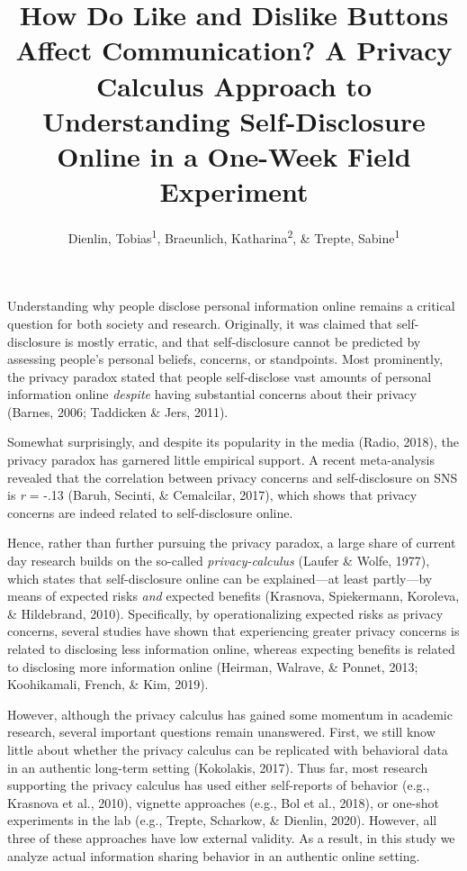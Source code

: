 \documentclass[
  english,
  man,floatsintext]{apa6}
\author{Dienlin, Tobias\textsuperscript{1}, Braeunlich, Katharina\textsuperscript{2}, \& Trepte, Sabine\textsuperscript{1}}
\affiliation{
\vspace{0.5cm}
\textsuperscript{1} University of Hohenheim\\\textsuperscript{2} University of Koblenz-Landau}
\title{How Do Like and Dislike Buttons Affect Communication? A Privacy Calculus Approach to Understanding Self-Disclosure Online in a One-Week Field Experiment}
\date{}
\begin{document}
\maketitle

Understanding why people disclose personal information online remains a critical question for both society and research.
Originally, it was claimed that self-disclosure is mostly erratic, and that self-disclosure cannot be predicted by assessing people's personal beliefs, concerns, or standpoints.
Most prominently, the privacy paradox stated that people self-disclose vast amounts of personal information online \emph{despite} having substantial concerns about their privacy (Barnes, 2006; Taddicken \& Jers, 2011).

Somewhat surprisingly, and despite its popularity in the media (Radio, 2018), the privacy paradox has garnered little empirical support.
A recent meta-analysis revealed that the correlation between privacy concerns and self-disclosure on SNS is \emph{r} = -.13 (Baruh, Secinti, \& Cemalcilar, 2017), which shows that privacy concerns are indeed related to self-disclosure online.

Hence, rather than further pursuing the privacy paradox, a large share of current day research builds on the so-called \emph{privacy-calculus} (Laufer \& Wolfe, 1977), which states that self-disclosure online can be explained---at least partly---by means of expected risks \emph{and} expected benefits (Krasnova, Spiekermann, Koroleva, \& Hildebrand, 2010).
Specifically, by operationalizing expected risks as privacy concerns, several studies have shown that experiencing greater privacy concerns is related to disclosing less information online, whereas expecting benefits is related to disclosing more information online (Heirman, Walrave, \& Ponnet, 2013; Koohikamali, French, \& Kim, 2019).

However, although the privacy calculus has gained some momentum in academic research, several important questions remain unanswered.
First, we still know little about whether the privacy calculus can be replicated with behavioral data in an authentic long-term setting (Kokolakis, 2017).
Thus far, most research supporting the privacy calculus has used either self-reports of behavior (e.g., Krasnova et al., 2010), vignette approaches (e.g., Bol et al., 2018), or one-shot experiments in the lab (e.g., Trepte, Scharkow, \& Dienlin, 2020).
However, all three of these approaches have low external validity.
As a result, in this study we analyze actual information sharing behavior in an authentic online setting.
\end{document}
